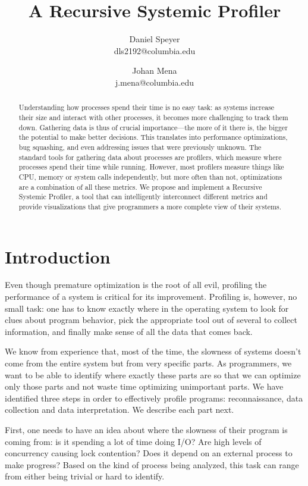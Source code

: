 \documentclass[10pt]{article}
\author{Daniel Speyer\\dls2192@columbia.edu \and Johan Mena\\j.mena@columbia.edu}
\title{\textbf{A Recursive Systemic Profiler}}
\date{}
\begin{document}
\maketitle

\begin{abstract}

Understanding how processes spend their time is no easy task: as systems
increase their size and interact with other processes, it becomes more
challenging to track them down. Gathering data is thus of crucial
importance---the more of it there is, the bigger the potential to make better
decisions.  This translates into performance optimizations, bug squashing, and
even addressing issues that were previously unknown. The standard tools for
gathering data about processes are profilers, which measure where processes
spend their time while running. However, most profilers measure things like
CPU, memory or system calls independently, but more often than not,
optimizations are a combination of all these metrics. We propose and implement
a Recursive Systemic Profiler, a tool that can intelligently interconnect
different metrics and provide visualizations that give programmers a more
complete view of their systems.

\end{abstract}

\section{Introduction}
Even though premature optimization is the root of all evil, profiling the
performance of a system is critical for its improvement. Profiling is, however,
no small task: one has to know exactly where in the operating system to look for
clues about program behavior, pick the appropriate tool out of several to collect
information, and finally make sense of all the data that comes back.

We know from experience that, most of the time, the slowness of systems doesn't
come from the entire system but from very specific parts. As programmers, we want
to be able to identify where exactly these parts are so that we can optimize only
those parts and not waste time optimizing unimportant parts. We have identified
three steps in order to effectively profile programs: reconnaissance, data
collection and data interpretation. We describe each part next.

First, one needs to have an idea about where the slowness of their program is
coming from: is it spending a lot of time doing I/O? Are high levels of
concurrency causing lock contention? Does it depend on an external process to
make progress? Based on the kind of process being analyzed, this task can range
from either being trivial or hard to identify.
\end{document}
